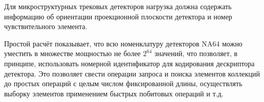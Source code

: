 Для микроструктурных трековых детекторов нагрузка должна содержать
информацию об ориентации проекционной плоскости детектора и номер
чувствительного элемента.

Простой расчёт показывает, что всю номенклатуру детекторов NA64
можно уместить в множестве мощностью не более $2^{64}$ значений,
что позволяет, в принципе, использовать номерной идентификатор
для кодирования дескриптора детектора. Это позволяет свести
операции запроса и поиска элементов коллекций до простых
операций с целым числом фиксированной длины, осуществлять выборку
элементов применением быстрых побитовых операций и т.д.

